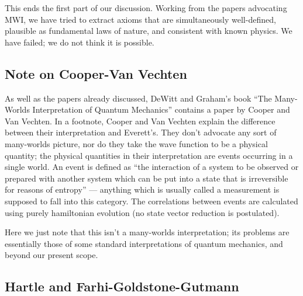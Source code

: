 \documentclass[aps,pra,12pt]{revtex4}
\begin{document}
This ends the first part of our discussion.  
Working from the papers advocating MWI, we have tried to extract axioms that 
are simultaneously well-defined, plausible as fundamental laws of nature,
and consistent with known physics.
We have failed; we do not think it is possible.

\subsection{Note on Cooper-Van Vechten}

As well as the papers already discussed, DeWitt and Graham's book 
``The Many-Worlds Interpretation of Quantum Mechanics''\cite{mwbook} 
contains a paper by Cooper and Van Vechten.\cite{cvv}  
In a footnote, Cooper and Van Vechten explain the difference between
their interpretation and Everett's.  
They don't advocate any sort of many-worlds picture, nor do they take  
the wave function to be a physical quantity; the physical quantities
in their interpretation are events occurring in a single world. 
An event is defined 
as ``the interaction of a system to be observed or prepared with another system
which can be put into a state that is irreversible for reasons of entropy'' ---
anything which is usually called a measurement is supposed to fall into this
category. The correlations between events are calculated using purely
hamiltonian evolution (no state vector reduction is postulated). 

Here we just note that this isn't a many-worlds interpretation; its 
problems are essentially those of some standard interpretations of quantum 
mechanics, and beyond our present scope. 

\subsection{Hartle and Farhi-Goldstone-Gutmann} 
\end{document}
